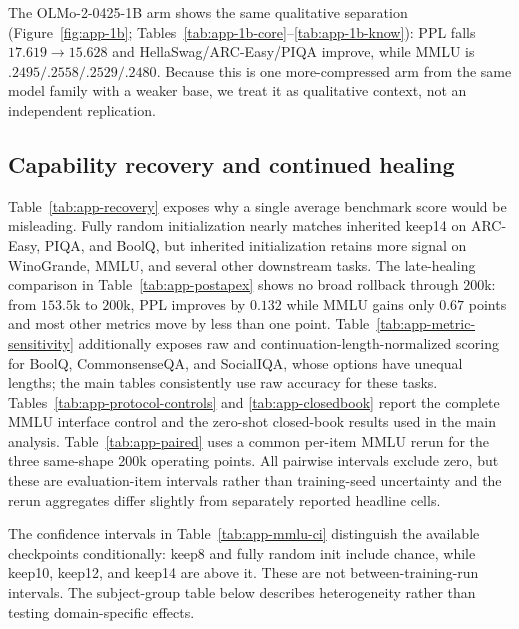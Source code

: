 The OLMo-2-0425-1B arm shows the same qualitative separation
(Figure~\ref{fig:app-1b}; Tables~\ref{tab:app-1b-core}--\ref{tab:app-1b-know}):
PPL falls $17.619\to15.628$ and HellaSwag/ARC-Easy/PIQA improve, while MMLU is
$.2495/.2558/.2529/.2480$. Because this is one more-compressed arm from the same
model family with a weaker base, we treat it as qualitative context, not an
independent replication.



\subsection{Capability recovery and continued healing}
\label{app:recovery}








Table~\ref{tab:app-recovery} exposes why a single average benchmark score would
be misleading. Fully random initialization nearly matches inherited keep14 on
ARC-Easy, PIQA, and BoolQ, but inherited initialization retains more signal on
WinoGrande, MMLU, and several other downstream tasks. The late-healing
comparison in Table~\ref{tab:app-postapex} shows no broad rollback through
$200$k: from $153.5$k to $200$k, PPL improves by $0.132$ while MMLU gains only
$0.67$ points and most other metrics move by less than one point.
Table~\ref{tab:app-metric-sensitivity} additionally exposes raw and
continuation-length-normalized scoring for BoolQ, CommonsenseQA, and SocialIQA,
whose options have unequal lengths; the main tables consistently use raw
accuracy for these tasks. Tables~\ref{tab:app-protocol-controls} and
\ref{tab:app-closedbook} report the complete MMLU interface control and the
zero-shot closed-book results used in the main analysis.
Table~\ref{tab:app-paired} uses a common per-item MMLU rerun for the three
same-shape 200k operating points. All pairwise intervals exclude zero, but these
are evaluation-item intervals rather than training-seed uncertainty and the
rerun aggregates differ slightly from separately reported headline cells.

The confidence intervals in Table~\ref{tab:app-mmlu-ci} distinguish the
available checkpoints conditionally: keep8 and fully random init include
chance, while keep10, keep12, and keep14 are above it. These are not
between-training-run intervals. The subject-group table below describes
heterogeneity rather than testing domain-specific effects.

